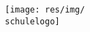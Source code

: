 
\begin{titlepage}

	\begin{flushright}
		\texttt{[image: res/img/\\schulelogo]}
	\end{flushright}

	\begin{center}
		\begin{spacing}{3}
		{\LARGE{\bfseries{\schulelangname}}}
		\end{spacing}
		{\LARGE \schuleabteilung}
	\end{center}


\end{titlepage}
